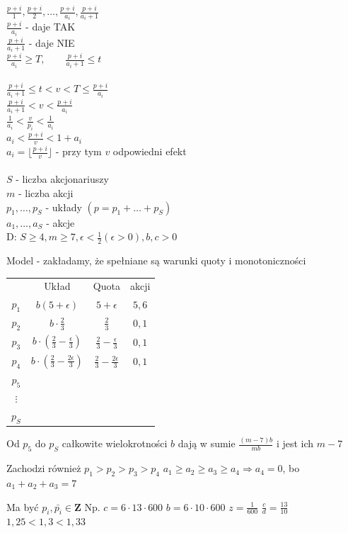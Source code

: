 \documentclass[12pt,a4paper]{article}
\theoremstyle{break}
\begin{document}
	$\frac{p+i}{1},\frac{p+i}{2},\dots,\frac{p+i}{a_i},\frac{p+i}{a_i+1}$\\
	$\frac{p+i}{a_i}$ - daje TAK\\
	$\frac{p+i}{a_i+1}$ - daje NIE\\
	$\frac{p+i}{a_i}\geq T, \qquad \frac{p+i}{a_i+1}\leq t$\\\\
	
	$\frac{p+i}{a_i+1}\leq t < v < T \leq \frac{p+i}{a_i}$\\
	$\frac{p+i}{a_i+1}<v<\frac{p+i}{a_i}$\\
	$\frac{1}{a_i}<\frac{v}{p_i}<\frac{1}{a_i}$\\
	$a_i<\frac{p+i}{v}<1+a_i$\\
	$a_i=\lfloor \frac{p+i}{v}\rfloor$ - przy tym $v$ odpowiedni efekt\\\\
	
	$S$ - liczba akcjonariuszy\\
	$m$ - liczba akcji\\
	$p_1,\dots,p_S$ - układy $(p=p_1+\dots+p_S)$\\
	$a_1,\dots,a_S$ - akcje\\
	
	D: $S\geq 4, m\geq 7, \epsilon<\frac{1}{2} (\epsilon>0), b,c>0$
	
	Model - zakładamy, że spełniane są warunki quoty i monotoniczności
	
	\begin{tabular}{c|c|c|c}
		&Układ&Quota&akcji\\
		$p_1$&$b(5+\epsilon)$&$5+\epsilon$&$5,6$\\
		$p_2$&$b\cdot\frac{2}{3}$&$\frac{2}{3}$&$0,1$\\
		$p_3$&$b\cdot(\frac{2}{3}-\frac{\epsilon}{3})$&$\frac{2}{3}-\frac{\epsilon}{3}$&$0,1$\\
		$p_4$&$b\cdot(\frac{2}{3}-\frac{2\epsilon}{3})$&$\frac{2}{3}-\frac{2\epsilon}{3}$&$0,1$\\
		$p_5$&&&\\
		$\vdots$&&&\\
		$p_S$&&&\\
	\end{tabular}
	Od $p_5$ do $p_S$ całkowite wielokrotności $b$ dają w sumie $\frac{(m-7)b}{mb}$ i jest ich $m-7$
	
	Zachodzi również $p_1>p_2>p_3>p_4$
	$a_1\geq a_2 \geq a_3 \geq a_4 \Rightarrow a_4=0$, bo $a_1+a_2+a_3 = 7$
	
	Ma być $p_i,\bar{p_i}\in \mathbf{Z}$
	Np. $c=6\cdot13\cdot600$
	$b=6\cdot10\cdot600$
	$z=\frac{1}{600}$
	$\frac{c}{d}=\frac{13}{10}$
	$1,25<1,3<1,33$
	
\end{document}
